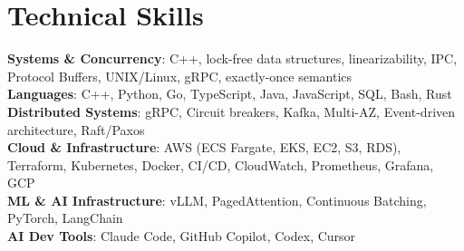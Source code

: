 \documentclass[letterpaper,11pt]{article}
\begin{document}
\section{Technical Skills}
\vspace{-7pt}
\begin{itemize}
[leftmargin=0.15in, label={}]\small{\item{
        \textbf{Systems \& Concurrency}{: C++, lock-free data structures, linearizability, IPC, Protocol Buffers, UNIX/Linux, gRPC, exactly-once semantics} \\
        \textbf{Languages}{: C++, Python, Go, TypeScript, Java, JavaScript, SQL, Bash, Rust} \\
        \textbf{Distributed Systems}{: gRPC, Circuit breakers, Kafka, Multi-AZ, Event-driven architecture, Raft/Paxos} \\
        \textbf{Cloud \& Infrastructure}{: AWS (ECS Fargate, EKS, EC2, S3, RDS), Terraform, Kubernetes, Docker, CI/CD, CloudWatch, Prometheus, Grafana, GCP} \\
        \textbf{ML \& AI Infrastructure}{: vLLM, PagedAttention, Continuous Batching, PyTorch, LangChain} \\
        \textbf{AI Dev Tools}{: Claude Code, GitHub Copilot, Codex, Cursor} \\
}}
\end{itemize}
\end{document}
